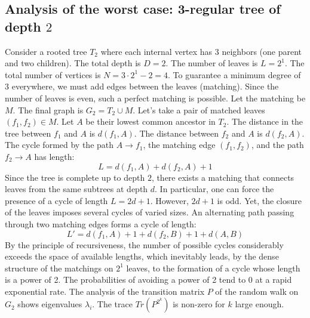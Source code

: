 \documentclass[12pt,a4paper]{article}
\begin{document}
\subsection{Analysis of the worst case: 3-regular tree of depth $2$}
Consider a rooted tree $T_{2}$ where each internal vertex has 3 neighbors (one parent and two children).
The total depth is $D = 2$.
The number of leaves is $L = 2^{1}$.
The total number of vertices is $N = 3 \cdot 2^{1} - 2 = 4$.
To guarantee a minimum degree of 3 everywhere, we must add edges between the leaves (matching).
Since the number of leaves is even, such a perfect matching is possible.
Let the matching be $M$. The final graph is $G_{2} = T_{2} \cup M$.
Let's take a pair of matched leaves $(f_1, f_2) \in M$.
Let $A$ be their lowest common ancestor in $T_{2}$.
The distance in the tree between $f_1$ and $A$ is $d(f_1, A)$.
The distance between $f_2$ and $A$ is $d(f_2, A)$.
The cycle formed by the path $A \to f_1$, the matching edge $(f_1, f_2)$, and the path $f_2 \to A$ has length:
$$ L = d(f_1, A) + d(f_2, A) + 1 $$
Since the tree is complete up to depth $2$, there exists a matching that connects leaves from the same subtrees at depth $d$.
In particular, one can force the presence of a cycle of length $L = 2d + 1$. However, $2d+1$ is odd.
Yet, the closure of the leaves imposes several cycles of varied sizes. An alternating path passing through two matching edges forms a cycle of length:
$$ L' = d(f_1, A) + 1 + d(f_2, B) + 1 + d(A, B) $$
By the principle of recursiveness, the number of possible cycles considerably exceeds the space of available lengths, which inevitably leads, by the dense structure of the matchings on $2^{1}$ leaves, to the formation of a cycle whose length is a power of 2. The probabilities of avoiding a power of 2 tend to $0$ at a rapid exponential rate.
The analysis of the transition matrix $P$ of the random walk on $G_{2}$ shows eigenvalues $\lambda_i$. The trace $Tr(P^{2^k})$ is non-zero for $k$ large enough.
\end{document}
